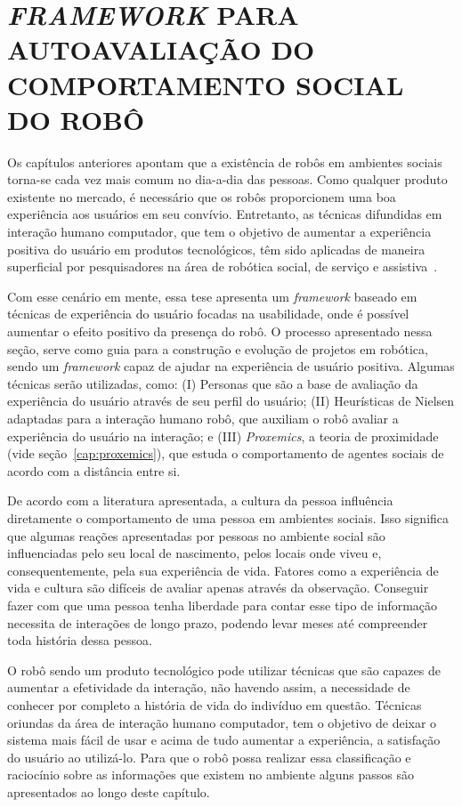 \chapter{\emph{FRAMEWORK} PARA AUTOAVALIAÇÃO DO COMPORTAMENTO SOCIAL DO ROBÔ}
\label{cap:proposta}

Os capítulos anteriores apontam que a existência de robôs em ambientes sociais torna-se cada vez mais comum no dia-a-dia das pessoas. Como qualquer produto existente no mercado, é necessário que os robôs proporcionem uma boa experiência aos usuários em seu convívio. Entretanto, as técnicas difundidas em interação humano computador, que tem o objetivo de aumentar a experiência positiva do usuário em produtos tecnológicos, têm sido aplicadas de maneira superficial por pesquisadores na área de robótica social, de serviço e assistiva~\cite{alenljung:2017}.

Com esse cenário em mente, essa tese apresenta um \emph{framework} baseado em técnicas de experiência do usuário focadas na usabilidade, onde é possível aumentar o efeito positivo da presença do robô. O processo apresentado nessa seção, serve como guia para a construção e evolução de projetos em robótica, sendo um \emph{framework} capaz de ajudar na experiência de usuário positiva. Algumas técnicas serão utilizadas, como: (I) Personas que são a base de avaliação da experiência do usuário através de seu perfil do usuário; (II) Heurísticas de Nielsen adaptadas para a interação humano robô, que auxiliam o robô avaliar a experiência do usuário na interação; e (III) \emph{Proxemics}, a teoria de proximidade (vide seção~\ref{cap:proxemics}), que estuda o comportamento de agentes sociais de acordo com a distância entre si.

De acordo com a literatura apresentada, a cultura da pessoa influência diretamente o comportamento de uma pessoa em ambientes sociais. Isso significa que algumas reações apresentadas por pessoas no ambiente social são influenciadas pelo seu local de nascimento, pelos locais onde viveu e, consequentemente, pela sua experiência de vida. Fatores como a experiência de vida e cultura são difíceis de avaliar apenas através da observação. Conseguir fazer com que uma pessoa tenha liberdade para contar esse tipo de informação necessita de interações de longo prazo, podendo levar meses até compreender toda história dessa pessoa.

O robô sendo um produto tecnológico pode utilizar técnicas que são capazes de aumentar a efetividade da interação, não havendo assim, a necessidade de conhecer por completo a história de vida do indivíduo em questão. Técnicas oriundas da área de interação humano computador, tem o objetivo de deixar o sistema mais fácil de usar e acima de tudo aumentar a experiência, a satisfação do usuário ao utilizá-lo. Para que o robô possa realizar essa classificação e raciocínio sobre as informações que existem no ambiente alguns passos são apresentados ao longo deste capítulo.

